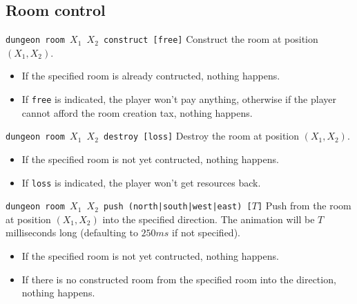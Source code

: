 \documentclass[10pt,a4paper]{scrartcl}
\newenvironment{apiCode}[1]
{ \begin{lrbox}{\mybox} \begin{minipage}{0.9\textwidth} {\color{Mahogany} \small\texttt{#1}} \vspace{8pt} \newline }
{ \end{minipage} \end{lrbox}\fbox{\usebox{\mybox}} \newline\vspace{4pt}\newline }
\begin{document}
\subsection{Room control}
\begin{apiCode}{dungeon room $X_1$ $X_2$ construct [free]}
Construct the room at position $(X_1, X_2)$.
\begin{itemize}
\itemsep 0em
\item If the specified room is already contructed, nothing happens.
\item If \verb#free# is indicated, the player won't pay anything,\newline
	  otherwise if the player cannot afford the room creation tax, nothing happens.
\end{itemize}
\end{apiCode}
\begin{apiCode}{dungeon room $X_1$ $X_2$ destroy [loss]}
Destroy the room at position $(X_1, X_2)$.
\begin{itemize}
\itemsep 0em
\item If the specified room is not yet contructed, nothing happens.
\item If \verb#loss# is indicated, the player won't get resources back.
\end{itemize}
\end{apiCode}
\begin{apiCode}{dungeon room $X_1$ $X_2$ push (north|south|west|east) [$T$]}
Push from the room at position $(X_1, X_2)$ into the specified direction.\newline
The animation will be $T$ milliseconds long (defaulting to $250ms$ if not specified).
\begin{itemize}
\itemsep 0em
\item If the specified room is not yet contructed, nothing happens.
\item If there is no constructed room from the specified room\newline
	  into the direction, nothing happens.
\end{itemize}
\end{apiCode}
\end{document}
